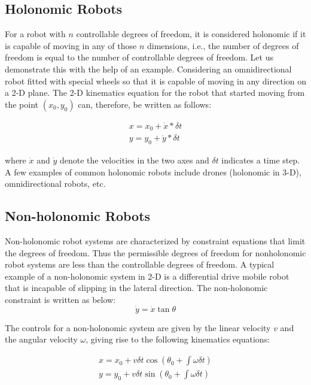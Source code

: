 \subsection{Holonomic Robots}\label{sec:holonomic_robots}

For a robot with $n$ controllable degrees of freedom, it is considered holonomic if it is capable of moving in any of those $n$ dimensions, i.e., the number of degrees of freedom is equal to the number of controllable degrees of freedom. Let us demonstrate this with the help of an example. Considering an omnidirectional robot fitted with special wheels so that it is capable of moving in any direction on a 2-D plane. The 2-D kinematics equation for the robot that started moving from the point $(x_0, y_0)$ can, therefore, be written as follows:

\begin{subequations}
\begin{align}
x = x_0+\dot{x}*\delta t\\
y = y_0+\dot{y}*\delta t
\end{align}
\end{subequations}

where $\dot{x}$ and $\dot{y}$ denote the velocities in the two axes and $\delta t$ indicates a time step.
A few examples of common holonomic robots include drones (holonomic in 3-D), omnidirectional robots, etc.

\subsection{Non-holonomic Robots}

Non-holonomic robot systems are characterized by constraint equations that limit the degrees of freedom. Thus the permissible degrees of freedom for nonholonomic robot systems are less than the controllable degrees of freedom. A typical example of a non-holonomic system in 2-D is a differential drive mobile robot that is incapable of slipping in the lateral direction. The non-holonomic constraint is written as below:
\begin{equation}
\dot{y} = \dot{x}\tan{\theta}
\end{equation}

The controls for a non-holonomic system are given by the linear velocity $v$ and the angular velocity $\omega$, giving rise to the following kinematics equations:

\begin{subequations}
\begin{align}
x = x_0 + v\delta t\cos{(\theta_0+\int\omega\delta t)}\\
y = y_0 + v\delta t\sin{(\theta_0+\int\omega\delta t)}\\
\end{align}
\end{subequations} 

